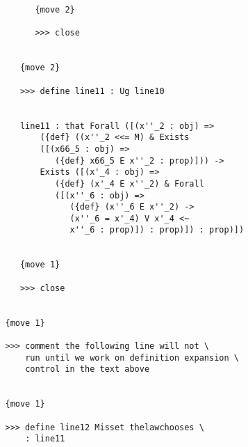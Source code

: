 \documentclass{article}
\begin{document}
\begin{verbatim}
         {move 2}

         >>> close


      {move 2}

      >>> define line11 : Ug line10


      line11 : that Forall ([(x''_2 : obj) => 
          ({def} ((x''_2 <<= M) & Exists 
          ([(x66_5 : obj) => 
             ({def} x66_5 E x''_2 : prop)])) -> 
          Exists ([(x'_4 : obj) => 
             ({def} (x'_4 E x''_2) & Forall 
             ([(x''_6 : obj) => 
                ({def} (x''_6 E x''_2) -> 
                (x''_6 = x'_4) V x'_4 <~ 
                x''_6 : prop)]) : prop)]) : prop)])


      {move 1}

      >>> close


   {move 1}

   >>> comment the following line will not \
       run until we work on definition expansion \
       control in the text above


   {move 1}

   >>> define line12 Misset thelawchooses \
       : line11



\end{verbatim}
\end{document}
